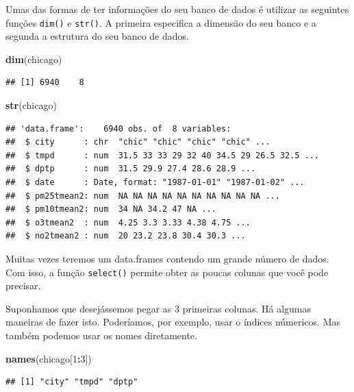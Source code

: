 \documentclass[a4paper]{book}
\newenvironment{Shaded}{\begin{snugshade}}{\end{snugshade}}
\newcommand{\DecValTok}[1]{\textcolor[rgb]{0.00,0.00,0.81}{#1}}
\newcommand{\KeywordTok}[1]{\textcolor[rgb]{0.13,0.29,0.53}{\textbf{#1}}}
\newcommand{\NormalTok}[1]{#1}
\newcommand{\OperatorTok}[1]{\textcolor[rgb]{0.81,0.36,0.00}{\textbf{#1}}}
\begin{document}
Umas das formas de ter informações do seu banco de dados é utilizar as seguintes funções \texttt{dim()} e \texttt{str()}. A primeira especifica a dimensão do seu banco e a segunda a estrutura do seu banco de dados.

\begin{Shaded}
\begin{Highlighting}[]
\KeywordTok{dim}\NormalTok{(chicago)}
\end{Highlighting}
\end{Shaded}

\begin{verbatim}
## [1] 6940    8
\end{verbatim}

\begin{Shaded}
\begin{Highlighting}[]
\KeywordTok{str}\NormalTok{(chicago)}
\end{Highlighting}
\end{Shaded}

\begin{verbatim}
## 'data.frame':    6940 obs. of  8 variables:
##  $ city      : chr  "chic" "chic" "chic" "chic" ...
##  $ tmpd      : num  31.5 33 33 29 32 40 34.5 29 26.5 32.5 ...
##  $ dptp      : num  31.5 29.9 27.4 28.6 28.9 ...
##  $ date      : Date, format: "1987-01-01" "1987-01-02" ...
##  $ pm25tmean2: num  NA NA NA NA NA NA NA NA NA NA ...
##  $ pm10tmean2: num  34 NA 34.2 47 NA ...
##  $ o3tmean2  : num  4.25 3.3 3.33 4.38 4.75 ...
##  $ no2tmean2 : num  20 23.2 23.8 30.4 30.3 ...
\end{verbatim}

Muitas vezes teremos um data.frames contendo um grande número de dados. Com isso, a função \texttt{select()} permite obter as poucas colunas que você pode precisar.

Suponhamos que desejássemos pegar as 3 primeiras colunas. Há algumas maneiras de fazer isto. Poderíamos, por exemplo, usar o índices númericos. Mas também podemos usar os nomes diretamente.

\begin{Shaded}
\begin{Highlighting}[]
\KeywordTok{names}\NormalTok{(chicago[}\DecValTok{1}\OperatorTok{:}\DecValTok{3}\NormalTok{]) }
\end{Highlighting}
\end{Shaded}

\begin{verbatim}
## [1] "city" "tmpd" "dptp"
\end{verbatim}
\end{document}
